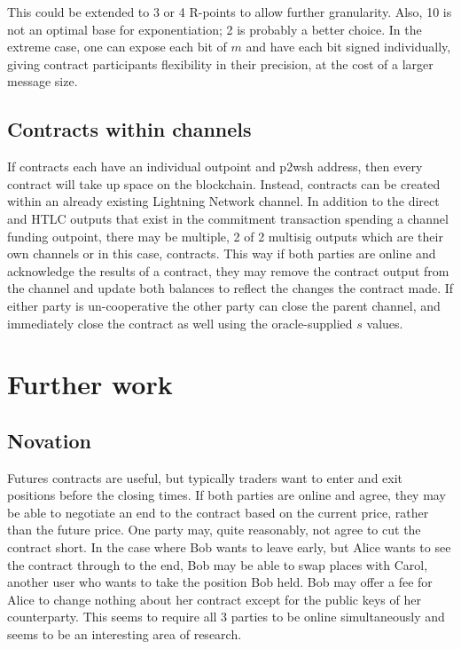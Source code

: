 \documentclass[11pt]{article}
\begin{document}
This could be extended to 3 or 4 R-points to allow further granularity.  Also, 10 is not an optimal base for exponentiation; 2 is probably a better choice.  In the extreme case, one can expose each bit of \(m\) and have each bit signed individually, giving contract participants flexibility in their precision, at the cost of a larger message size.

\subsection*{Contracts within channels}

If contracts each have an individual outpoint and p2wsh address, then every contract will take up space on the blockchain.  Instead, contracts can be created within an already existing Lightning Network channel.  In addition to the direct and HTLC outputs that exist in the commitment transaction spending a channel funding outpoint, there may be multiple, 2 of 2 multisig outputs which are their own channels or in this case, contracts.  This way if both parties are online and acknowledge the results of a contract, they may remove the contract output from the channel and update both balances to reflect the changes the contract made.  If either party is un-cooperative the other party can close the parent channel, and immediately close the contract as well using the oracle-supplied \(s\) values.

\section*{Further work}

\subsection*{Novation}

Futures contracts are useful, but typically traders want to enter and exit positions before the closing times.   If both parties are online and agree, they may be able to negotiate an end to the contract based on the current price, rather than the future price.  One party may, quite reasonably, not agree to cut the contract short.  In the case where Bob wants to leave early, but Alice wants to see the contract through to the end, Bob may be able to swap places with Carol, another user who wants to take the position Bob held.  Bob may offer a fee for Alice to change nothing about her contract except for the public keys of her counterparty.  This seems to require all 3 parties to be online simultaneously and seems to be an interesting area of research.
\end{document}

